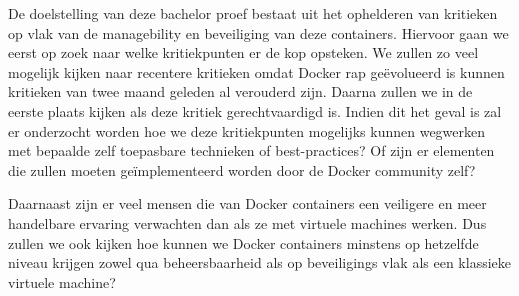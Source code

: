De doelstelling van deze bachelor proef bestaat uit het ophelderen van kritieken op vlak van de managebility en beveiliging van deze containers. Hiervoor gaan we eerst op zoek naar welke kritiekpunten er de kop opsteken. We zullen zo veel mogelijk kijken naar recentere kritieken omdat Docker rap geëvolueerd is kunnen kritieken van twee maand geleden al verouderd zijn. Daarna zullen we in de eerste plaats kijken als deze kritiek gerechtvaardigd is. Indien dit het geval is zal er onderzocht worden hoe we deze kritiekpunten mogelijks kunnen wegwerken met bepaalde zelf toepasbare technieken of best-practices? Of zijn er elementen die zullen moeten geïmplementeerd worden door de Docker community zelf?

Daarnaast zijn er veel mensen die van Docker containers een veiligere en meer handelbare ervaring verwachten dan als ze met virtuele machines werken. Dus zullen we ook kijken hoe kunnen we Docker containers minstens op hetzelfde niveau krijgen zowel qua beheersbaarheid als op beveiligings vlak als een klassieke virtuele machine?
